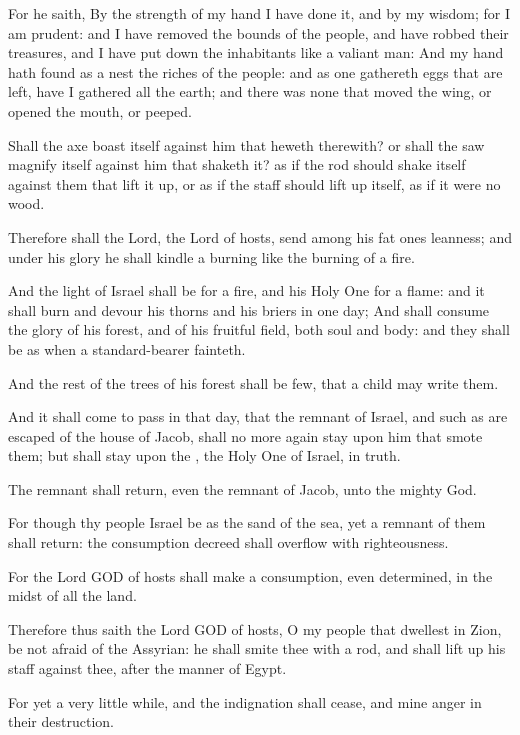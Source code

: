 \verse For he saith, By the strength of my hand I have done it, and by my wisdom; for I am prudent: and I have removed the bounds of the people, and have robbed their treasures, and I have put down the inhabitants like a valiant man: \verse And my hand hath found as a nest the riches of the people: and as one gathereth eggs that are left, have I gathered all the earth; and there was none that moved the wing, or opened the mouth, or peeped.

\verse Shall the axe boast itself against him that heweth therewith? or shall the saw magnify itself against him that shaketh it? as if the rod should shake itself against them that lift it up, or as if the staff should lift up itself, as if it were no wood.

\verse Therefore shall the Lord, the Lord of hosts, send among his fat ones leanness; and under his glory he shall kindle a burning like the burning of a fire.

\verse And the light of Israel shall be for a fire, and his Holy One for a flame: and it shall burn and devour his thorns and his briers in one day; \verse And shall consume the glory of his forest, and of his fruitful field, both soul and body: and they shall be as when a standard-bearer fainteth.

\verse And the rest of the trees of his forest shall be few, that a child may write them.

\verse And it shall come to pass in that day, that the remnant of Israel, and such as are escaped of the house of Jacob, shall no more again stay upon him that smote them; but shall stay upon the \LORD, the Holy One of Israel, in truth.

\verse The remnant shall return, even the remnant of Jacob, unto the mighty God.

\verse For though thy people Israel be as the sand of the sea, yet a remnant of them shall return: the consumption decreed shall overflow with righteousness.

\verse For the Lord GOD of hosts shall make a consumption, even determined, in the midst of all the land.

\verse Therefore thus saith the Lord GOD of hosts, O my people that dwellest in Zion, be not afraid of the Assyrian: he shall smite thee with a rod, and shall lift up his staff against thee, after the manner of Egypt.

\verse For yet a very little while, and the indignation shall cease, and mine anger in their destruction.

